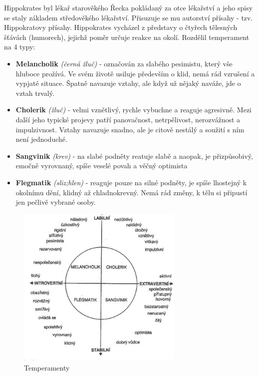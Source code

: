 \documentclass[a4paper,12pt]{report}
\begin{document}
Hippokrates byl lékař starověkého Řecka pokládaný za otce lékařství a jeho spisy se staly základem středověkého lékařství. Přisuzuje se mu autorství přísahy - tzv. Hippokratovy přísahy. Hippokrates vycházel z představy o čtyřech tělesných šťávách (humorech), jejichž poměr určuje reakce na okolí. Rozdělil temperament na 4 typy:

\begin{itemize} 
 \item \textbf{Melancholik} \textit{(černá žluč)} - označován za slabého pesimistu, který vše hluboce prožívá. Ve svém životě usiluje především o klid, nemá rád vzrušení a vypjaté situace. Špatně navazuje vztahy, ale když už nějaký naváže, jde o vztah trvalý.
 \item \textbf{Cholerik} \textit{(žluč)} - velmi vznětlivý, rychle vybuchne a reaguje agresivně. Mezi další jeho typické projevy patří panovačnost, netrpělivost, nerozvážnost a impulzivnost. Vztahy navazuje snadno, ale je citově nestálý a soužití s ním není jednoduché.
 \item \textbf{Sangvinik} \textit{(krev)} - na slabé podněty reatuje slabě a naopak, je přizpůsobivý, emočně vyrovnaný, spíše veselé povah a věčný optimista
 \item \textbf{Flegmatik} \textit{(sliz;hlen)} - reaguje pouze na silné podněty, je spíše lhostejný k okolnímu dění, klidný až chladnokrevný. Nemá rád změny, k tělu si připustí jen pečlivě vybrané osoby.
\end{itemize}

\begin{figure}[hp!]
\begin{center}
\includegraphics[width=0.71\textwidth]{zdroje/temperament.jpg}
\caption{Temperamenty}
\end{center}
\end{figure}
\end{document}
